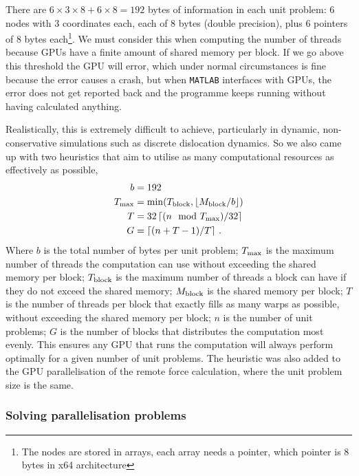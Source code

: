 There are $6\times 3\times 8 + 6\times 8 = 192$ bytes of information in each unit problem: 6 nodes with 3 coordinates each, each of 8 bytes (double precision), plus 6 pointers of 8 bytes each\footnote{The nodes are stored in arrays, each array needs a pointer, which pointer is 8 bytes in x64 architecture}. We must consider this when computing the number of threads because GPUs have a finite amount of shared memory per block. If we go above this threshold the GPU will error, which under normal circumstances is fine because the error causes a crash, but when \texttt{MATLAB} interfaces with GPUs, the error does not get reported back and the programme keeps running without having calculated anything.

Realistically, this is extremely difficult to achieve, particularly in dynamic, non-conservative simulations such as discrete dislocation dynamics. So we also came up with two heuristics that aim to utilise as many computational resources as effectively as possible,
\begin{align}\label{eq:numThreads}
    b            & = 192                                                               \\
    T_{\textrm{max}} & = \min(T_{\textrm{block}}, \left\lfloor M_{\textrm{block}}/b \right\rfloor) \\
    T            & = 32 \left\lceil (n \mod{T_{\textrm{max}}})/32 \right\rceil           \\
    G            & = \left\lceil (n + T - 1) / T \right\rceil\,.
\end{align}
Where $b$ is the total number of bytes per unit problem; $T_{\textrm{max}}$ is the maximum number of threads the computation can use without exceeding the shared memory per block; $T_{\textrm{block}}$ is the maximum number of threads a block can have if they do not exceed the shared memory; $M_{\textrm{block}}$ is the shared memory per block; $T$ is the number of threads per block that exactly fills as many warps as possible, without exceeding the shared memory per block; $n$ is the number of unit problems; $G$ is the number of blocks that distributes the computation most evenly. This ensures any GPU that runs the computation will always perform optimally for a given number of unit problems. The heuristic was also added to the GPU parallelisation of the remote force calculation, where the unit problem size is the same.

\subsubsection{Solving parallelisation problems}

